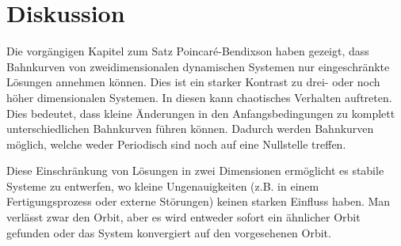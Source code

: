 \section{Diskussion} \label{poinbendix:section:diskussion}
Die vorgängigen Kapitel zum Satz Poincaré-Bendixson haben gezeigt, dass Bahnkurven von zweidimensionalen dynamischen Systemen nur eingeschränkte Lösungen annehmen können.
Dies ist ein starker Kontrast zu drei- oder noch höher dimensionalen Systemen.
In diesen kann chaotisches Verhalten auftreten.
Dies bedeutet, dass kleine Änderungen in den Anfangsbedingungen zu komplett unterschiedlichen Bahnkurven führen können.
Dadurch werden Bahnkurven möglich, welche weder Periodisch sind noch auf eine Nullstelle treffen.

Diese Einschränkung von Lösungen in zwei Dimensionen ermöglicht es stabile Systeme zu entwerfen, wo kleine Ungenauigkeiten (z.B. in einem Fertigungsprozess oder externe Störungen) keinen starken Einfluss haben.
Man verlässt zwar den Orbit, aber es wird entweder sofort ein ähnlicher Orbit gefunden oder das System konvergiert auf den vorgesehenen Orbit.
